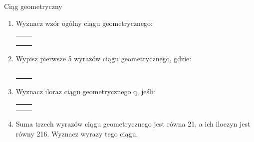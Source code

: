 \documentclass[12pt,a4paper]{article}
\begin{document}
	\begin{center}
	\LARGE Ciąg geometryczny
	\end{center}
	\vspace{1cm}
	
	\begin{enumerate}[1.]
		
		\item Wyznacz wzór ogólny ciągu geometrycznego:

	\begin{enumerate}[a)] \begin{tabular}{p{7cm} p{7cm}} 
			\item $6,12,24,\dots$& \vspace{0.4cm} 	\item $6,12,24,\dots$ \\
			\item $8,-4,2,\dots$&  	\item $\frac{1}{2},\frac{1}{4},\frac{1}{8},\dots$ \\
			\item $\frac{2}{5},\frac{1}{2},\frac{5}{8},\dots$&  	\item $2,3,4\frac{1}{2},\dots$ \\
	\end{tabular} \end{enumerate}

		\item Wypisz pierwsze 5 wyrazów ciągu geometrycznego, gdzie: 
		\begin{enumerate}[a)] \begin{tabular}{p{7cm} p{7cm}} 
		\item $a_1=1 \quad q=2$& \vspace{0.4cm} 	\item $a_1=\frac{1}{3} \quad q=3$ \\
		\item $a_1=2 \quad q=-5$&  	\item $a_1=16 \quad q=\frac{1}{2}$ \\
		\end{tabular} \end{enumerate}
	
	\item Wyznacz iloraz ciągu geometrycznego q, jeśli:
	\begin{enumerate}[a)] \begin{tabular}{p{7cm} p{7cm}} 
			\item $a_1=27 \quad a_2=9$& \vspace{0.4cm} 	\item $a_1=-1 \quad a_{10}=-512$ \\
			\item $a_2=1 \quad a_4=625$&  	\item $a_1=16 \quad a_5=\frac{1}{2}$ \\
	\end{tabular} \end{enumerate}

	\item Suma trzech wyrazów ciągu geometrycznego jest równa 21, a ich iloczyn jest równy 216. Wyznacz wyrazy tego ciągu.

\end{enumerate}
\end{document}
